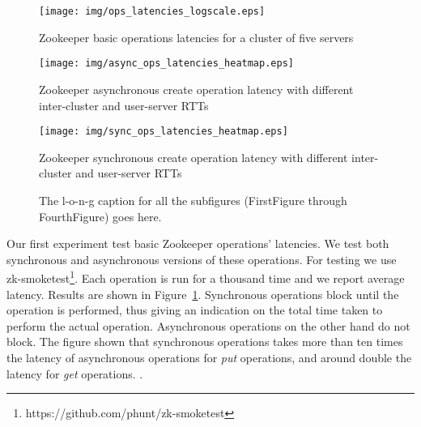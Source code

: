 \begin{figure}[h]
\centering
\texttt{[image: img/ops\_latencies\_logscale.eps]}
\caption{Zookeeper basic operations latencies for a cluster of five servers}
\label{fig:ops_latencies}
\end{figure}

\begin{figure}[h]
\centering
\texttt{[image: img/async\_ops\_latencies\_heatmap.eps]}
\caption{Zookeeper asynchronous create operation latency with different inter-cluster and user-server RTTs}
\label{fig:async_heatmap}
\end{figure}

\begin{figure}[h]
\centering
\texttt{[image: img/sync\_ops\_latencies\_heatmap.eps]}
\caption{Zookeeper synchronous create operation latency with different inter-cluster and user-server RTTs}
\label{fig:sync_heatmap}
\end{figure}

\begin{figure*}[ht!]
     \begin{center}
    \end{center}
    \caption{
        The l-o-n-g caption for all the subfigures
        (FirstFigure through FourthFigure) goes here.
     }
   \label{fig:subfigures}
\end{figure*}

Our first experiment test basic Zookeeper operations' latencies. We test both synchronous and asynchronous versions of these operations. For testing we use zk-smoketest\footnote{https://github.com/phunt/zk-smoketest}. Each operation is run for a thousand time and we report average latency. Results are shown in Figure~\ref{fig:ops_latencies}. Synchronous operations block until the operation is performed, thus giving an indication on the total time taken to perform the actual operation. Asynchronous operations on the other hand do not block. The figure shown that synchronous operations takes more than ten times the latency of asynchronous operations for \emph{put} operations, and around double the latency for \emph{get} operations. . 

